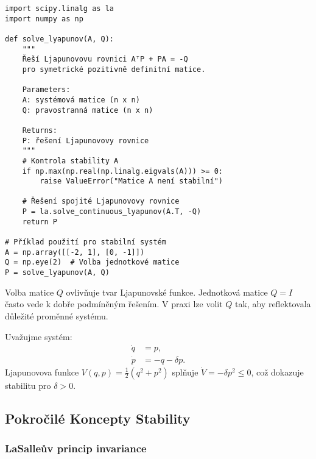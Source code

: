\begin{pseudocode}
\begin{verbatim}
import scipy.linalg as la
import numpy as np

def solve_lyapunov(A, Q):
    """
    Řeší Ljapunovovu rovnici AᵀP + PA = -Q
    pro symetrické pozitivně definitní matice.
    
    Parameters:
    A: systémová matice (n x n)
    Q: pravostranná matice (n x n)
    
    Returns:
    P: řešení Ljapunovovy rovnice
    """
    # Kontrola stability A
    if np.max(np.real(np.linalg.eigvals(A))) >= 0:
        raise ValueError("Matice A není stabilní")
    
    # Řešení spojité Ljapunovovy rovnice
    P = la.solve_continuous_lyapunov(A.T, -Q)
    return P

# Příklad použití pro stabilní systém
A = np.array([[-2, 1], [0, -1]])
Q = np.eye(2)  # Volba jednotkové matice
P = solve_lyapunov(A, Q)
\end{verbatim}
\end{pseudocode}

\begin{intuition}
Volba matice $Q$ ovlivňuje tvar Ljapunovské funkce. Jednotková matice $Q = I$ často vede k dobře podmíněným řešením. V praxi lze volit $Q$ tak, aby reflektovala důležité proměnné systému.
\end{intuition}

\begin{example}
Uvažujme systém:
\begin{align*}
\dot{q} &= p, \\
\dot{p} &= -q - \delta p.
\end{align*}
Ljapunovova funkce $V(q,p) = \frac{1}{2}(q^2 + p^2)$ splňuje $\dot{V} = -\delta p^2 \leq 0$, což dokazuje stabilitu pro $\delta > 0$.
\end{example}

\spc

\subsection{Pokročilé Koncepty Stability}

\subsubsection{LaSalleův princip invariance}

